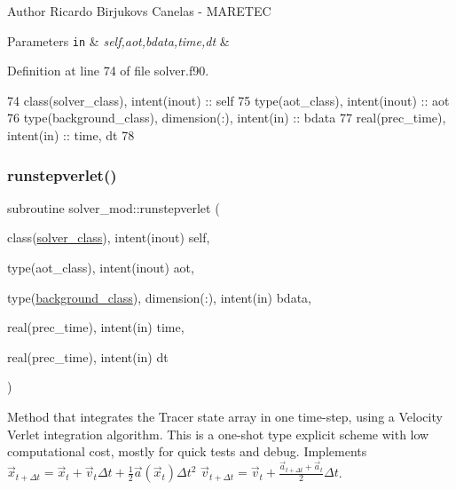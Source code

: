 \begin{DoxyAuthor}{Author}
Ricardo Birjukovs Canelas -\/ M\+A\+R\+E\+T\+EC 
\end{DoxyAuthor}

\begin{DoxyParams}[1]{Parameters}
\mbox{\tt in}  & {\em self,aot,bdata,time,dt} & \\
\hline
\end{DoxyParams}


Definition at line 74 of file solver.\+f90.


\begin{DoxyCode}
74     \textcolor{keywordtype}{class}(solver\_class), \textcolor{keywordtype}{intent(inout)} :: self
75     \textcolor{keywordtype}{type}(aot\_class), \textcolor{keywordtype}{intent(inout)} :: aot
76     \textcolor{keywordtype}{type}(background\_class), \textcolor{keywordtype}{dimension(:)}, \textcolor{keywordtype}{intent(in)} :: bdata
77     \textcolor{keywordtype}{real(prec\_time)}, \textcolor{keywordtype}{intent(in)} :: time, dt
78 
\end{DoxyCode}
\mbox{\label{namespacesolver__mod_acf893016edd8e0eb4bc77666aed1096f}} 
\subsubsection{\texorpdfstring{runstepverlet()}{runstepverlet()}}
{\footnotesize\ttfamily subroutine solver\+\_\+mod\+::runstepverlet (\begin{DoxyParamCaption}\item[{class(\mbox{\hyperlink{structsolver__mod_1_1solver__class}{solver\+\_\+class}}), intent(inout)}]{self,  }\item[{type(aot\+\_\+class), intent(inout)}]{aot,  }\item[{type(\mbox{\hyperlink{structbackground__mod_1_1background__class}{background\+\_\+class}}), dimension(\+:), intent(in)}]{bdata,  }\item[{real(prec\+\_\+time), intent(in)}]{time,  }\item[{real(prec\+\_\+time), intent(in)}]{dt }\end{DoxyParamCaption})\hspace{0.3cm}{\ttfamily [private]}}



Method that integrates the Tracer state array in one time-\/step, using a Velocity Verlet integration algorithm. This is a one-\/shot type explicit scheme with low computational cost, mostly for quick tests and debug. Implements $ {\vec {x}}_{t+\Delta t}={\vec {x}}_{t}+{\vec {v}}_{t}\Delta t+{\frac {1}{2}}{\vec {a}}({\vec {x}}_{t})\Delta t^{2}$ $ {\vec {v}}_{t+\Delta t}={\vec {v}}_{t}+\frac{{\vec {a}}_{t+\Delta t}+{\vec {a}}_{t}}{2}\Delta t$. 

